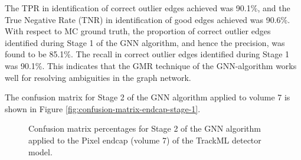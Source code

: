 The TPR in identification of correct outlier edges achieved was 90.1\%, and the True Negative Rate (TNR) in identification of good edges achieved was 90.6\%. With respect to MC ground truth, the proportion of correct outlier edges identified during Stage 1 of the GNN algorithm, and hence the precision, was found to be 85.1\%. The recall in correct outlier edges identified during Stage 1 was 90.1\%. This indicates that the GMR technique of the GNN-algorithm works well for resolving ambiguities in the graph network.

The confusion matrix for Stage 2 of the GNN algorithm applied to volume 7 is shown in Figure \ref{fig:confusion-matrix-endcap-stage-1}.

\begin{figure}[htbp]%
    \centering
    \caption{Confusion matrix percentages for Stage 2 of the GNN algorithm applied to the Pixel endcap (volume 7) of the TrackML detector model.}
    \label{fig:confusion-matrix-endcap-stage-2}
\end{figure}

